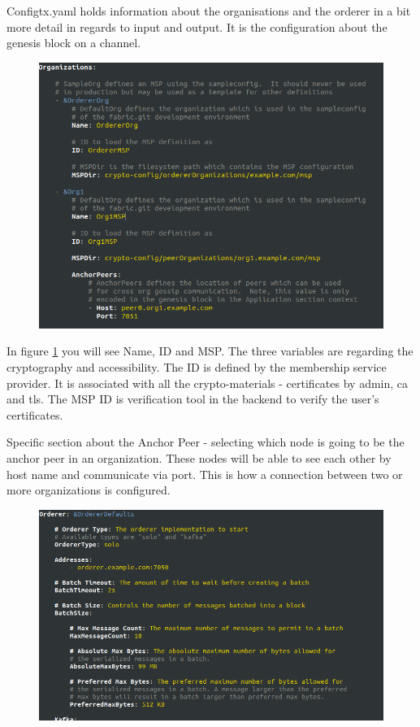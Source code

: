 \documentclass[a4paper,11pt]{report}
\begin{document}
Configtx.yaml holds information about the organisations and the orderer in a bit more detail in regards to input and output. It is the configuration about the genesis block on a channel. 

\begin{figure}[h]
\centering
  \includegraphics[width = 16cm]{configtx1.png}
  \caption{ }
  \label{configtx1}
\end{figure}

In figure \ref{configtx1} you will see Name, ID and MSP. The three variables are regarding the cryptography and accessibility. The ID is defined by the membership service provider. It is associated with all the crypto-materials - certificates by admin, ca and tls. The MSP ID is verification tool in the backend to verify the user’s certificates.
  
Specific section about the Anchor Peer - selecting which node is going to be the anchor peer in an organization. These nodes will be able to see each other by host name and communicate via port. This is how a connection between two or more organizations is configured. 

\begin{figure}[h]
\centering
  \includegraphics[width = 16cm]{configtx2.png}
  \caption{ }
  \label{dockerEnvironment}
\end{figure}
\end{document}
